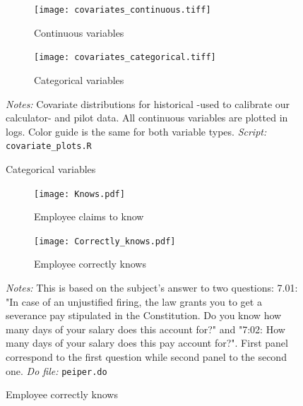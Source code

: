 \documentclass[11pt]{article}
\begin{document}
\begin{figure}[H]
\caption{Covariate distribution in Historical and Pilot data}
\label{covariate_distribution}
    \begin{center}
        \begin{subfigure}{0.49\textwidth}
            \caption{Continuous variables}
            \centering
            \texttt{[image: covariates\_continuous.tiff]}
        \end{subfigure}
        \begin{subfigure}{0.49\textwidth}
            \caption{Categorical variables}
            \centering
            \texttt{[image: covariates\_categorical.tiff]}
        \end{subfigure}
    \end{center}
    {\footnotesize \textit{Notes: } Covariate distributions for historical -used to calibrate our calculator- and pilot data. All continuous variables are plotted in logs. Color guide is the same for both variable types.}
    {\footnotesize \textit{Script: } \texttt{covariate\_plots.R}}
\end{figure}

\begin{figure}[H]
    \caption{Percent that know main legal constitutional entitlement}
    \label{Knowindemfig}
    \begin{center}
        \begin{subfigure}{0.49\textwidth}
            \caption{Employee claims to know}
            \centering
            \texttt{[image: Knows.pdf]}
        \end{subfigure}
        \begin{subfigure}{0.49\textwidth}
            \caption{Employee correctly knows }
                \centering
                \texttt{[image: Correctly\_knows.pdf]}
        \end{subfigure}
        \end{center}
    {\footnotesize \textit{Notes: } This is based on the subject's answer to two questions: 7.01: "In case of an unjustified firing, the law grants you to get a severance pay stipulated in the Constitution. Do you know how many days of your salary does this account for?" and "7:02: How many days of your salary does this pay account for?". First panel correspond to the first question while second panel to the second one.}
    {\footnotesize \textit{Do file: } \texttt{peiper.do}}
\end{figure}
\end{document}
